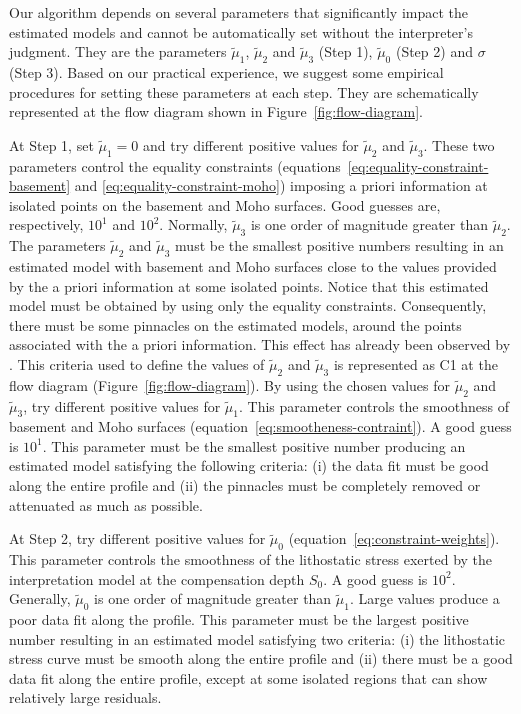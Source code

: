 \documentclass[manuscript]{geophysics}
\begin{document}
Our algorithm depends on several parameters that significantly impact the estimated models
and cannot be automatically set without the interpreter’s judgment.
They are the parameters $\tilde{\mu}_{1}$, $\tilde{\mu}_{2}$ and $\tilde{\mu}_{3}$
(Step 1), $\tilde{\mu}_{0}$ (Step 2) and $\sigma$ (Step 3).
Based on our practical experience, we suggest some empirical procedures for setting these
parameters at each step. They are schematically represented at the flow diagram shown
in Figure~\ref{fig:flow-diagram}.

At Step 1, set $\tilde{\mu}_{1} = 0$ and try different positive values for 
$\tilde{\mu}_{2}$ and $\tilde{\mu}_{3}$. 
These two parameters control the equality constraints
(equations~\ref{eq:equality-constraint-basement} and \ref{eq:equality-constraint-moho})
imposing a priori information at isolated points on the basement and Moho surfaces.
Good guesses are, respectively,
$10^{1}$ and $10^{2}$. Normally, $\tilde{\mu}_{3}$ is one order of magnitude greater
than $\tilde{\mu}_{2}$. 
The parameters $\tilde{\mu}_{2}$ and $\tilde{\mu}_{3}$ 
must be the smallest positive numbers resulting in an estimated model with
basement and Moho surfaces close to the values provided by the a priori information
at some isolated points. Notice that this estimated model must be obtained 
by using only the equality constraints. Consequently, there must be some
pinnacles on the estimated models, around the points associated with the a priori 
information. This effect has already been observed by \citet{barbosa-etal1997}.
This criteria used to define the values of $\tilde{\mu}_{2}$ and $\tilde{\mu}_{3}$ 
is represented as C1 at the flow diagram (Figure~\ref{fig:flow-diagram}).
By using the chosen values for $\tilde{\mu}_{2}$ and $\tilde{\mu}_{3}$, 
try different positive values for $\tilde{\mu}_{1}$. 
This parameter controls the smoothness of basement and Moho surfaces
(equation~\ref{eq:smootheness-contraint}).
A good guess is $10^{1}$.
This parameter must be the smallest positive number producing an estimated model
satisfying the following criteria: (i) the data fit must be good along the entire profile
and (ii) the pinnacles must be completely removed or attenuated as much as possible.

At Step 2, try different positive values for $\tilde{\mu}_{0}$ 
(equation~\ref{eq:constraint-weights}). This parameter
controls the smoothness of the lithostatic stress exerted by the interpretation model
at the compensation depth $S_{0}$. A good guess is $10^{2}$.
Generally, $\tilde{\mu}_{0}$ is one order of magnitude greater than
$\tilde{\mu}_{1}$. Large values produce a poor data fit along the profile.
This parameter must be the largest positive number resulting in an estimated
model satisfying two criteria: (i) the lithostatic stress curve must be smooth
along the entire profile and (ii) there must be a good data fit along the entire
profile, except at some isolated regions that can show relatively large residuals.
\end{document}
